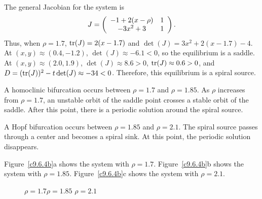\documentclass{ximera}
\begin{document}
\para The general Jacobian for the system is
\[
J = \left(\begin{array}{cc} -1 + 2(x - \rho) & 1\\ -3x^2 + 3 &1\end{array}\right).
\]
Thus, when $\rho = 1.7$, ${\rm tr}(J) = 2(x - 1.7)$ and
$\det(J) = 3x^2 + 2(x - 1.7) - 4$.  At $(x,y) \approx (0.4,-1.2)$,
$\det(J) \approx -6.1 < 0$, so the equilibrium is a saddle.  At
$(x,y) \approx (2.0,1.9)$, $\det(J) \approx 8.6 > 0$, ${\rm tr}(J) \approx
0.6 > 0$, and $D = ({\rm tr}(J))^2 - t\det(J) \approx -34 < 0$.  Therefore,
this equilibrium is a spiral source.

 A homoclinic bifurcation occurs between $\rho = 1.7$ and
$\rho = 1.85$.  As $\rho$ increases from $\rho = 1.7$, an unstable
orbit of the saddle point crosses a stable orbit of the saddle.  After
this point, there is a periodic solution around the spiral source.

 A Hopf bifurcation occurs between $\rho = 1.85$ and
$\rho = 2.1$.  The spiral source passes through a center and becomes a
spiral sink.  At this point, the periodic solution disappears.

Figure~\ref{c9.6.4b}a shows the system with $\rho = 1.7$.
Figure~\ref{c9.6.4b}b shows the system with $\rho = 1.85$.
Figure~\ref{c9.6.4b}c shows the system with $\rho = 2.1$.

\begin{figure}[htb]
                       \centerline{%
                       }
		\centerline{$\rho = 1.7$\hspace{1.3in}$\rho = 1.85$
\hspace{1.3in}$\rho = 2.1$}
\end{figure}
\end{document}
